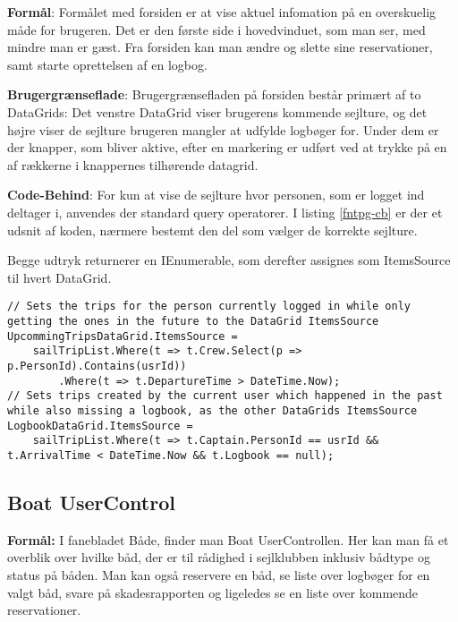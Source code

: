 \textbf{Formål}: 
Formålet med forsiden er at vise aktuel infomation på en overskuelig måde for brugeren.
Det er den første side i hovedvinduet, som man ser, med mindre man er gæst.
Fra forsiden kan man ændre og slette sine reservationer, samt starte oprettelsen af en logbog.

\textbf{Brugergrænseflade}: 
Brugergrænsefladen på forsiden består primært af to DataGrids: Det venstre DataGrid viser brugerens kommende sejlture, og det højre viser de sejlture brugeren mangler at udfylde logbøger for. 
Under dem er der knapper, som bliver aktive, efter en markering er udført ved at trykke på en af rækkerne i knappernes tilhørende datagrid.

\textbf{Code-Behind}: 
For kun at vise de sejlture hvor personen, som er logget ind deltager i, anvendes der standard query operatorer. 
I listing \ref{fntpg-cb} er der et udsnit af koden, nærmere bestemt den del som vælger de korrekte sejlture.

Begge udtryk returnerer en IEnumerable, som derefter assignes som ItemsSource til hvert DataGrid.

\begin{lstlisting}[frame=single, caption=Forsidens Code-Behind, label=fntpg-cb]
// Sets the trips for the person currently logged in while only getting the ones in the future to the DataGrid ItemsSource
UpcommingTripsDataGrid.ItemsSource =
    sailTripList.Where(t => t.Crew.Select(p => p.PersonId).Contains(usrId))
        .Where(t => t.DepartureTime > DateTime.Now);
// Sets trips created by the current user which happened in the past while also missing a logbook, as the other DataGrids ItemsSource 
LogbookDataGrid.ItemsSource =
    sailTripList.Where(t => t.Captain.PersonId == usrId && t.ArrivalTime < DateTime.Now && t.Logbook == null);
\end{lstlisting}

\subsection{Boat UserControl}

\textbf{Formål:}
I fanebladet Både, finder man Boat UserControllen.
Her kan man få et overblik over hvilke båd, der er til rådighed i sejlklubben inklusiv bådtype og status på båden. 
Man kan også reservere en båd, se liste over logbøger for en valgt båd, svare på skadesrapporten og ligeledes se en liste over kommende reservationer. 

